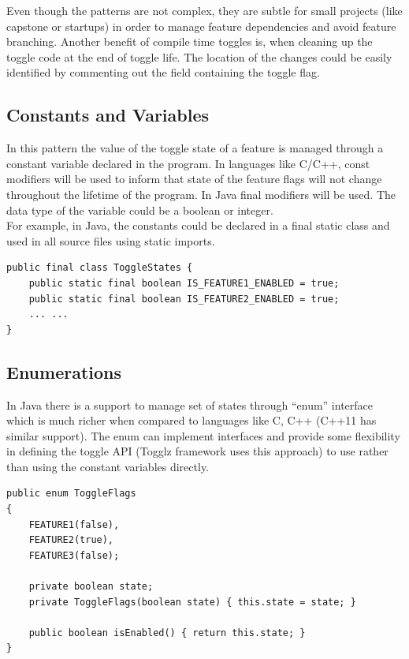 \documentclass[conference]{IEEEtran}
\begin{document}
Even though the patterns are not complex, they are subtle for small projects (like capstone or startups) in order to manage feature dependencies and 
avoid feature branching. Another benefit of compile time toggles is, when 
cleaning up the toggle code at the end of toggle life. The location of the 
changes could be easily identified by commenting out the field containing the toggle flag.

\subsection{Constants and Variables}
In this pattern the value of the toggle state of a feature is managed through a constant variable declared in the program. In languages like C/C++, const modifiers will be used to inform that state of the feature flags will not change throughout the lifetime of the program. In Java final modifiers will be used. The data type of the variable could be a boolean or integer.\\

For example,  in Java, the constants could be declared in a final static class and used in all source files using static imports.\\

\begin{lstlisting}
public final class ToggleStates {
    public static final boolean IS_FEATURE1_ENABLED = true;
    public static final boolean IS_FEATURE2_ENABLED = true;
    ... ...
}
\end{lstlisting}

\subsection{Enumerations}
In Java there is a support to manage set of states through “enum” interface which is much richer when compared to languages like C, C++ (C++11 has similar support). The enum can implement interfaces and provide some flexibility in defining the toggle API (Togglz framework uses this approach) to use rather than using the constant variables directly.\\

\begin{lstlisting}
public enum ToggleFlags
{
    FEATURE1(false),
    FEATURE2(true),
    FEATURE3(false);

    private boolean state;
    private ToggleFlags(boolean state) { this.state = state; }

    public boolean isEnabled() { return this.state; }
}
\end{lstlisting}
\end{document}
